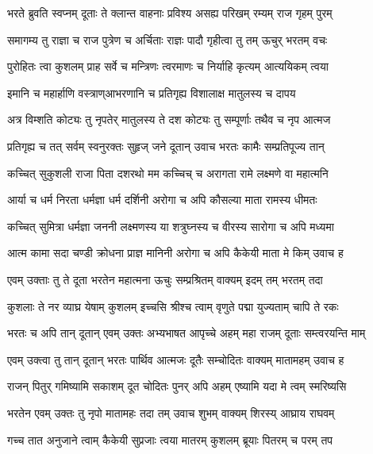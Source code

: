 
\twolineshloka
{भरते ब्रुवति स्वप्नम् दूताः ते क्लान्त वाहनाः}
{प्रविश्य असह्य परिखम् रम्यम् राज गृहम् पुरम्} %

\twolineshloka
{समागम्य तु राज्ञा च राज पुत्रेण च अर्चिताः}
{राज्ञः पादौ गृहीत्वा तु तम् ऊचुर् भरतम् वचः} %

\twolineshloka
{पुरोहितः त्वा कुशलम् प्राह सर्वे च मन्त्रिणः}
{त्वरमाणः च निर्याहि कृत्यम् आत्ययिकम् त्वया} %

\twolineshloka
{इमानि च महार्हाणि वस्त्राण्आभरणानि च}
{प्रतिगृह्य विशालाक्ष मातुलस्य च दापय} %

\twolineshloka
{अत्र विम्शति कोट्यः तु नृपतेर् मातुलस्य ते}
{दश कोट्यः तु सम्पूर्णाः तथैव च नृप आत्मज} %

\twolineshloka
{प्रतिगृह्य च तत् सर्वम् स्वनुरक्तः सुहृज् जने}
{दूतान् उवाच भरतः कामैः सम्प्रतिपूज्य तान्} %

\twolineshloka
{कच्चित् सुकुशली राजा पिता दशरथो मम}
{कच्चिच् च अरागता रामे लक्ष्मणे वा महात्मनि} %

\twolineshloka
{आर्या च धर्म निरता धर्मज्ञा धर्म दर्शिनी}
{अरोगा च अपि कौसल्या माता रामस्य धीमतः} %

\twolineshloka
{कच्चित् सुमित्रा धर्मज्ञा जननी लक्ष्मणस्य या}
{शत्रुघ्नस्य च वीरस्य सारोगा च अपि मध्यमा} %

\twolineshloka
{आत्म कामा सदा चण्डी क्रोधना प्राज्ञ मानिनी}
{अरोगा च अपि कैकेयी माता मे किम् उवाच ह} %

\twolineshloka
{एवम् उक्ताः तु ते दूता भरतेन महात्मना}
{ऊचुः सम्प्रश्रितम् वाक्यम् इदम् तम् भरतम् तदा} %

\twolineshloka
{कुशलाः ते नर व्याघ्र येषाम् कुशलम् इच्चसि}
{श्रीश्च त्वाम् वृणुते पद्मा युज्यताम् चापि ते रकः} %

\twolineshloka
{भरतः च अपि तान् दूतान् एवम् उक्तः अभ्यभाषत}
{आपृच्चे अहम् महा राजम् दूताः सम्त्वरयन्ति माम्} %

\twolineshloka
{एवम् उक्त्वा तु तान् दूतान् भरतः पार्थिव आत्मजः}
{दूतैः सम्चोदितः वाक्यम् मातामहम् उवाच ह} %

\twolineshloka
{राजन् पितुर् गमिष्यामि सकाशम् दूत चोदितः}
{पुनर् अपि अहम् एष्यामि यदा मे त्वम् स्मरिष्यसि} %

\twolineshloka
{भरतेन एवम् उक्तः तु नृपो मातामहः तदा}
{तम् उवाच शुभम् वाक्यम् शिरस्य् आघ्राय राघवम्} %

\twolineshloka
{गच्च तात अनुजाने त्वाम् कैकेयी सुप्रजाः त्वया}
{मातरम् कुशलम् ब्रूयाः पितरम् च परम् तप} %

